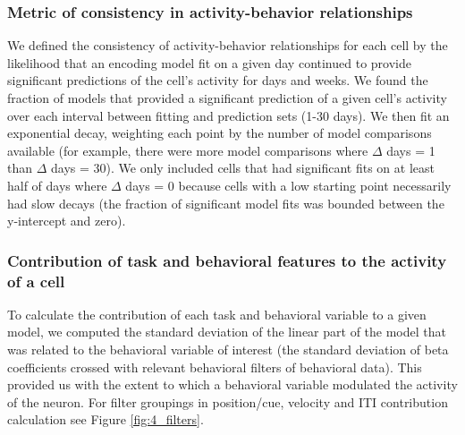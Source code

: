 \subsubsection{Metric of consistency in activity-behavior relationships}\label{methods:metric_consistency}
We defined the consistency of activity-behavior relationships for each cell by the likelihood that an encoding model fit on a given day continued to provide significant predictions of the cell's activity for days and weeks. We found the fraction of models that provided a significant prediction of a given cell's activity over each interval between fitting and prediction sets (1-30 days). We then fit an exponential decay, weighting each point by the number of model comparisons available (for example, there were more model comparisons where $\Delta$ days = 1 than $\Delta$ days = 30). We only included cells that had significant fits on at least half of days where $\Delta$ days = 0 because cells with a low starting point necessarily had slow decays (the fraction of significant model fits was bounded between the y-intercept and zero).

\subsubsection{Contribution of task and behavioral features to the activity of a cell}\label{methods:contrib}
To calculate the contribution of each task and behavioral variable to a given model, we computed the standard deviation of the linear part of the model that was related to the behavioral variable of interest (the standard deviation of beta coefficients crossed with relevant behavioral filters of behavioral data). This provided us with the extent to which a behavioral variable modulated the activity of the neuron. For filter groupings in position/cue, velocity and ITI contribution calculation see Figure \ref{fig:4_filters}.


